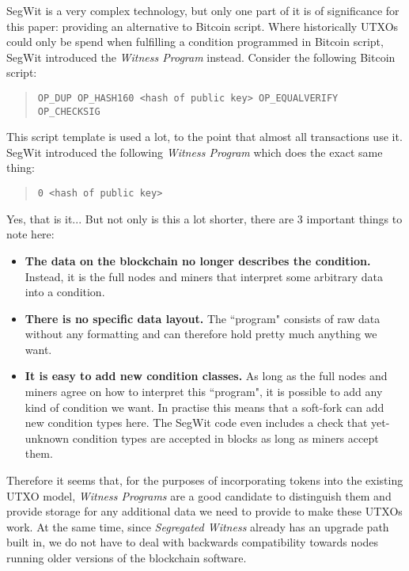 \documentclass{article}
\begin{document}
SegWit is a very complex technology, but only one part of it is of significance for this paper: providing an alternative to Bitcoin script. Where historically UTXOs could only be spend when fulfilling a condition programmed in Bitcoin script, SegWit introduced the \emph{Witness Program} instead. Consider the following Bitcoin script:

\begin{quote}
    \texttt{OP\_DUP OP\_HASH160 <hash of public key> OP\_EQUALVERIFY OP\_CHECKSIG}
\end{quote}

This script template is used a lot, to the point that almost all transactions use it. SegWit introduced the following \emph{Witness Program} which does the exact same thing:

\begin{quote}
    \texttt{0 <hash of public key>}
\end{quote}

Yes, that is it... But not only is this a lot shorter, there are 3 important things to note here:

\begin{itemize}
    \item \textbf{The data on the blockchain no longer describes the condition.} Instead, it is the full nodes and miners that interpret some arbitrary data into a condition.
    \item \textbf{There is no specific data layout.} The ``program" consists of raw data without any formatting and can therefore hold pretty much anything we want.
    \item \textbf{It is easy to add new condition classes.} As long as the full nodes and miners agree on how to interpret this ``program", it is possible to add any kind of condition we want. In practise this means that a soft-fork can add new condition types here. The SegWit code even includes a check that yet-unknown condition types are accepted in blocks as long as miners accept them.
\end{itemize}

Therefore it seems that, for the purposes of incorporating tokens into the existing UTXO model, \emph{Witness Programs} are a good candidate to distinguish them and provide storage for any additional data we need to provide to make these UTXOs work. At the same time, since \emph{Segregated Witness} already has an upgrade path built in, we do not have to deal with backwards compatibility towards nodes running older versions of the blockchain software.
\end{document}
